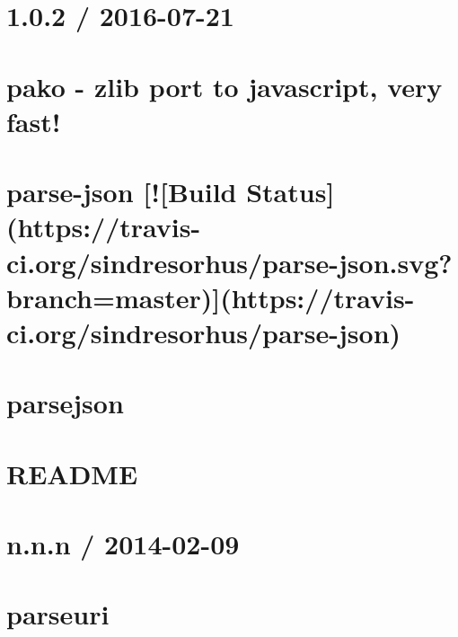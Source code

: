 \documentclass[twoside]{book}
\newcommand{\+}{\discretionary{\mbox{\scriptsize$\hookleftarrow$}}{}{}}
\begin{document}
\chapter{1.0.2 / 2016-\/07-\/21}
\label{md_app_web_node_modules_pako__c_h_a_n_g_e_l_o_g}

\chapter{pako -\/ zlib port to javascript, very fast!}
\label{md_app_web_node_modules_pako__r_e_a_d_m_e}

\chapter{parse-\/json \mbox{[}!\mbox{[}Build Status\mbox{]}(https\+://travis-\/ci.org/sindresorhus/parse-\/json.svg?branch=master)\mbox{]}(https\+://travis-\/ci.org/sindresorhus/parse-\/json)}
\label{md_app_web_node_modules_parse-json_readme}

\chapter{parsejson}
\label{md_app_web_node_modules_parsejson__r_e_a_d_m_e}

\chapter{R\+E\+A\+D\+ME}
\label{md_app_web_node_modules_parseqs__r_e_a_d_m_e}

\chapter{n.\+n.\+n / 2014-\/02-\/09}
\label{md_app_web_node_modules_parseuri__history}

\chapter{parseuri}
\label{md_app_web_node_modules_parseuri__r_e_a_d_m_e}

\end{document}
